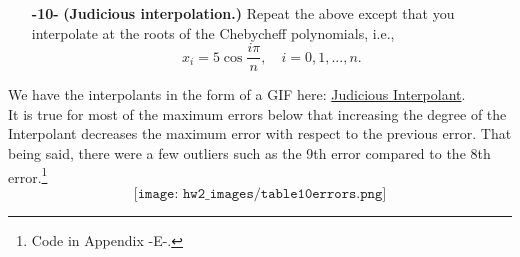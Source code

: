 \documentclass[11pt]{article}
\theoremstyle{definition}
\newcommand{\1}[1]{\mathbf{1} \left \{ #1 \right \}}
\begin{document}
\begin{itemize}
    \item[{\textbf{-10-}}] \textbf{(Judicious interpolation.)}  Repeat the above except that you interpolate at the roots of the Chebycheff polynomials, i.e.,
    \begin{equation}
        x_i = 5\cos \frac{i\pi}{n}, \quad i=0,1,...,n.
    \end{equation}
\end{itemize}
We have the interpolants in the form of a GIF here: \href{https://github.com/3rundane/Numerical-Analysis-Project/blob/main/homework\%202\%20gifs/problem10.gif}{Judicious Interpolant}. \\
It is true for most of the maximum errors below that increasing the degree of the Interpolant decreases the maximum error with respect to the previous error.  That being said, there were a few outliers such as the 9th error compared to the 8th error.\footnote{Code in Appendix -E-.}
\[\texttt{[image: hw2\_images/table10errors.png]}\]
\end{document}
